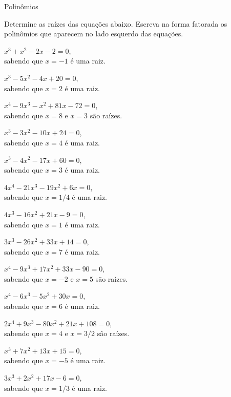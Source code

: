 \begin{exercicios}{Polinômios}
    \begin{exercicio}
        Determine as raízes das equações abaixo. Escreva na forma fatorada os polinômios que aparecem no lado esquerdo das equações.
        \begin{alphalist}
            \item $ x^3 +   x^2 -  2x   - 2         = 0$, \\[1mm] sabendo que $x =  -1$              é uma raiz.
            \item $ x^3 -  5x^2 -  4x   + 20        = 0$, \\[1mm] sabendo que $x =   2$              é uma raiz.
            \item $ x^4 -  9x^3 -   x^2 + 81x - 72  = 0$, \\[1mm] sabendo que $x =   8$ e $x = 3$    são raízes.
            \item $ x^3 -  3x^2 - 10x   + 24        = 0$, \\[1mm] sabendo que $x =   4$              é uma raiz.
            \item $ x^3 -  4x^2 - 17x   + 60        = 0$, \\[1mm] sabendo que $x =   3$              é uma raiz.
            \item $4x^4 - 21x^3 - 19x^2 + 6x        = 0$, \\[1mm] sabendo que $x = 1/4$              é uma raiz.
            \item $4x^3 - 16x^2 + 21x   - 9         = 0$, \\[1mm] sabendo que $x =   1$              é uma raiz.
            \item $3x^3 - 26x^2 + 33x   + 14        = 0$, \\[1mm] sabendo que $x =   7$              é uma raiz.
            \item $ x^4 -  9x^3 + 17x^2 + 33x - 90  = 0$, \\[1mm] sabendo que $x =  -2$ e $x = 5$    são raízes.
            \item $ x^4 -  6x^3 -  5x^2 + 30x       = 0$, \\[1mm] sabendo que $x =   6$              é uma raiz.
            \item $2x^4 +  9x^3 - 80x^2 + 21x + 108 = 0$, \\[1mm] sabendo que $x =   4$ e $x = 3/2$  são raízes.
            \item $ x^3 +  7x^2 + 13x   + 15        = 0$, \\[1mm] sabendo que $x =  -5$              é uma raiz.
            \item $3x^3 +  2x^2 + 17x   - 6         = 0$, \\[1mm] sabendo que $x = 1/3$              é uma raiz.

\end{alphalist}
\end{exercicio}
\end{exercicios}
